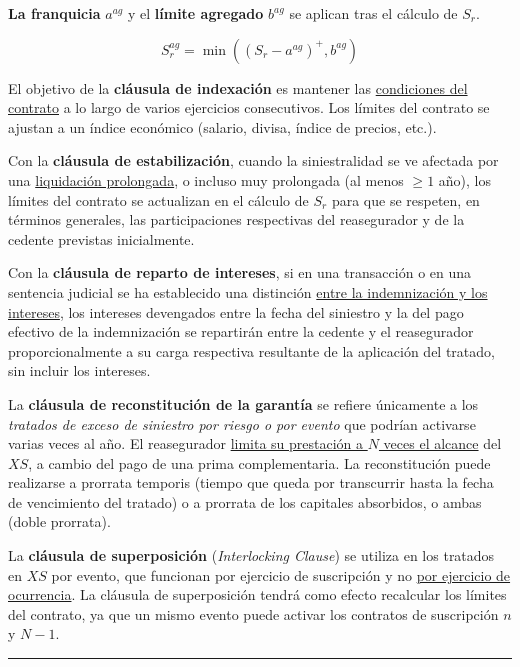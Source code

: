 \begin{f}
	
	\textbf{La franquicia} \(a^{ag}\) y el \textbf{límite agregado} \(b^{ag}\) se aplican tras el cálculo de \(S_r\). 
	
\[
S_r^{ag} = \min\left( \left(S_r - a^{ag}  \right)^+,b^{ag}\right)  
\]
\medskip

El objetivo de la \textbf{cláusula de indexación} es mantener las \underline{condiciones del contrato} a lo largo de varios ejercicios consecutivos.  Los límites del contrato se ajustan a un índice económico (salario, divisa, índice de precios, etc.).
\medskip

Con la \textbf{cláusula de estabilización}, cuando la siniestralidad se ve afectada por una \underline{liquidación prolongada}, o incluso muy prolongada (al menos \(\geq 1\) año), los límites del contrato se actualizan en el cálculo de \(S_r\) para que se respeten, en términos generales, las participaciones respectivas del reasegurador y de la cedente previstas inicialmente.
\medskip


Con la \textbf{cláusula de reparto de intereses}, si en una transacción o en una sentencia judicial se ha establecido una distinción \underline{entre
	la indemnización y los intereses}, los intereses devengados entre la fecha del siniestro y la del pago efectivo de la indemnización se repartirán entre la cedente y el reasegurador proporcionalmente a
su carga respectiva resultante de la aplicación del tratado, sin incluir los intereses.
\medskip


La \textbf{cláusula de reconstitución de la garantía}
se refiere únicamente a los \emph{tratados de exceso de siniestro por riesgo o por evento} que podrían activarse varias veces al año.
El reasegurador \underline{limita su prestación a \(N \) veces el alcance} del \(XS\), a cambio del pago de una prima complementaria. 
La reconstitución puede realizarse a prorrata temporis (tiempo que queda por transcurrir hasta la fecha
de vencimiento del tratado) o a prorrata de los capitales absorbidos, o ambas (doble prorrata). 

La \textbf{cláusula de superposición}
(\emph{Interlocking Clause})
se utiliza en los tratados en \(XS\) por evento,
que funcionan por ejercicio de suscripción y no \underline{por ejercicio de ocurrencia}.
La cláusula de
superposición tendrá como efecto recalcular los límites del contrato, ya que un mismo evento puede activar los contratos de suscripción \(n\) y \(N-1\).

\end{f}
\hrule

